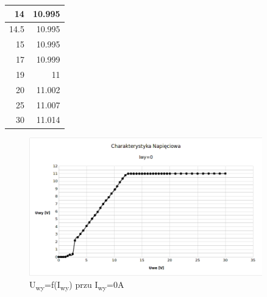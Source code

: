 \documentclass[a4paper,12pt]{article}
\begin{document}
\begin{table}[ht]
\begin{tabular}{|r|r|}
    14                                       & 10.995                                      \\ \hline
    14.5                                     & 10.995                                      \\ \hline
    15                                       & 10.995                                      \\ \hline
    17                                       & 10.999                                      \\ \hline
    19                                       & 11                                          \\ \hline
    20                                       & 11.002                                      \\ \hline
    25                                       & 11.007                                      \\ \hline
    30                                       & 11.014                                      \\ \hline
  \end{tabular}
\end{table}
\pagebreak

\begin{figure}[h!]
  \center
  \includegraphics[width=0.90\textwidth]{charak-napieciowa1}
  \caption{U\textsubscript{wy}=f(I\textsubscript{wy}) przu I\textsubscript{wy}=0A}
\end{figure}
\end{document}
